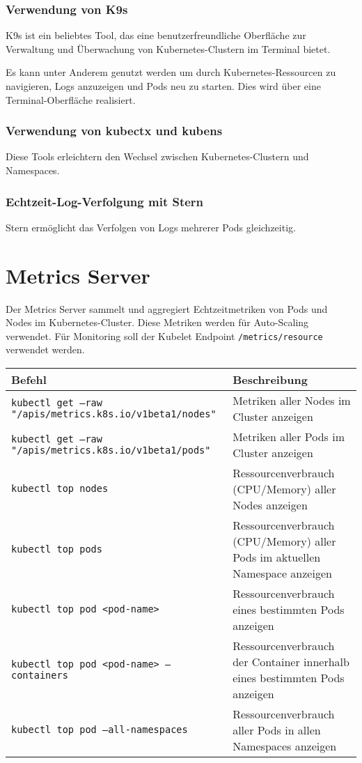 \subsubsection{Verwendung von K9s}
K9s ist ein beliebtes Tool, das eine benutzerfreundliche Oberfläche zur Verwaltung und Überwachung von Kubernetes-Clustern im Terminal bietet.

Es kann unter Anderem genutzt werden um durch Kubernetes-Ressourcen zu navigieren, Logs anzuzeigen und Pods neu zu starten. Dies wird über eine Terminal-Oberfläche realisiert.

\subsubsection{Verwendung von kubectx und kubens}
Diese Tools erleichtern den Wechsel zwischen Kubernetes-Clustern und Namespaces.


\subsubsection{Echtzeit-Log-Verfolgung mit Stern}
Stern ermöglicht das Verfolgen von Logs mehrerer Pods gleichzeitig.


\section{Metrics Server}
Der Metrics Server sammelt und aggregiert Echtzeitmetriken von Pods und Nodes im Kubernetes-Cluster. Diese Metriken werden für Auto-Scaling verwendet. Für Monitoring soll der Kubelet Endpoint \texttt{/metrics/resource} verwendet werden.\\

\noindent
\begin{tabular}{
|p{}|p{}|}
\hline
\textbf{Befehl} & \textbf{Beschreibung} \\
\hline
\texttt{kubectl get --raw "/apis/metrics.k8s.io/v1beta1/nodes"} & Metriken aller Nodes im Cluster anzeigen \\
\texttt{kubectl get --raw "/apis/metrics.k8s.io/v1beta1/pods"} & Metriken aller Pods im Cluster anzeigen \\
\texttt{kubectl top nodes} & Ressourcenverbrauch (CPU/Memory) aller Nodes anzeigen \\
\texttt{kubectl top pods} & Ressourcenverbrauch (CPU/Memory) aller Pods im aktuellen Namespace anzeigen \\
\texttt{kubectl top pod <pod-name>} & Ressourcenverbrauch eines bestimmten Pods anzeigen \\
\texttt{kubectl top pod <pod-name> --containers} & Ressourcenverbrauch der Container innerhalb eines bestimmten Pods anzeigen \\
\texttt{kubectl top pod --all-namespaces} & Ressourcenverbrauch aller Pods in allen Namespaces anzeigen \\
\hline
\end{tabular}
